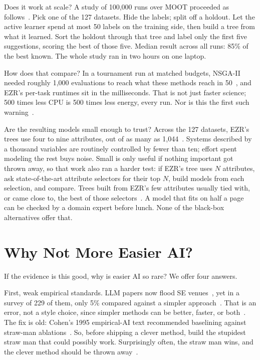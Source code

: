\documentclass[10pt,conference]{IEEEtran}
\begin{document}
Does it work at scale? A study of 100,000 runs over MOOT proceeded as
follows~\cite{ganguly26}. Pick one of the 127 datasets. Hide the
labels; split off a holdout. Let the active learner spend at most 50
labels on the training side, then build a tree from what it learned.
Sort the holdout through that tree and label only the first five
suggestions, scoring the best of those five. Median result across all
runs: 85\% of the best known. The whole study ran in two hours on one
laptop.

How does that compare? In a tournament run at matched budgets,
NSGA-II~\cite{deb02} needed roughly 1,000 evaluations to reach what
these methods reach in 50~\cite{ganguly26b}, and EZR's per-task
runtimes sit in the milliseconds. That is not just faster science;
500 times less CPU is 500 times less energy, every run. Nor is this
the first such warning~\cite{chen19, menzies21}.

Are the resulting models small enough to trust? Across the 127
datasets, EZR's trees use four to nine attributes, out of as many as
1,044~\cite{rayegan26}. Systems described by a thousand variables
are routinely controlled by fewer than ten; effort spent modeling
the rest buys noise. Small is only useful if nothing important got
thrown away, so that work also ran a harder test: if EZR's tree uses
$N$ attributes, ask state-of-the-art attribute selectors for their
top $N$, build models from each selection, and compare. Trees built
from EZR's few attributes usually tied with, or came close to, the
best of those selectors~\cite{rayegan26}. A model that fits on half
a page can be checked by a domain expert before lunch. None of the
black-box alternatives offer that.

\section{Why Not More Easier AI?}
\label{sec:whynot}
If the evidence is this good, why is easier AI so rare? We offer four
answers.

First, weak empirical standards. LLM papers now flood SE
venues~\cite{hou24}, yet in a survey of 229 of them, only 5\% compared
against a simpler approach~\cite{menzies26}. That is an error, not a
style choice, since simpler methods can be better, faster, or
both~\cite{fu17, majumder18, tawosi23}. The fix is old: Cohen's 1995
empirical-AI text recommended baselining against straw-man
ablations~\cite{cohen95}. So, before shipping a clever method, build
the stupidest straw man that could possibly work. Surprisingly
often, the straw man wins, and the clever method should be thrown
away~\cite{menzies21}.
\end{document}
